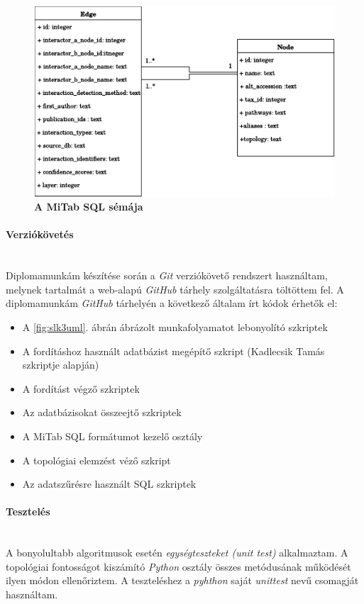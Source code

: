 \documentclass[a4paper,12pt]{article}
\begin{document}
				\begin{figure}[H]
					 \includegraphics[scale=0.7]{img/Mitab-SQL.pdf}
			 		 \centering
			 		 \caption{ \textbf{A MiTab SQL sémája} }
			 		 \label{fig:mitab_scheme}			 		 
				\end{figure}
				
			\paragraph{Verziókövetés} \mbox{}\\
			Diplomamunkám készítése során a \textit{Git} verziókövető rendszert használtam, melynek tartalmát a web-alapú \textit{GitHub} tárhely szolgáltatásra töltöttem fel. A diplomamunkám \textit{GitHub} tárhelyén \cite{github} a következő általam írt kódok érhetők el: 
				\begin{itemize}
						\item A \ref{fig:slk3uml}. ábrán ábrázolt munkafolyamatot lebonyolító szkriptek
						\item A fordításhoz használt adatbázist megépítő szkript (Kadlecsik Tamás szkriptje alapján)
						\item A fordítást végző szkriptek
						\item Az adatbázisokat összeejtő szkriptek
						\item A MiTab SQL formátumot kezelő osztály
						\item A topológiai elemzést véző szkript
						\item Az adatszűrésre használt SQL szkriptek
				\end{itemize}
				
			\paragraph{Tesztelés} \mbox{}\\
			A bonyolultabb algoritmusok esetén \textit{egységteszteket (unit test)} alkalmaztam. A topológiai fontosságot kiszámító \textit{Python} osztály összes metódusának működését ilyen módon ellenőriztem. A teszteléshez a \textit{pyhthon} saját \textit{unittest} nevű csomagját használtam.
				
\end{document}
